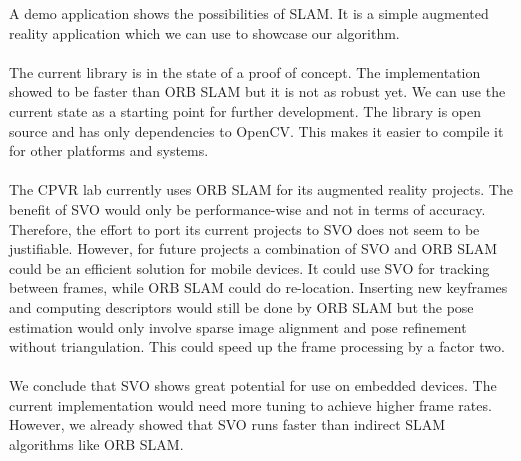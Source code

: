 \documentclass[11pt,a4paper,titlepage,oneside]{report}
\begin{document}
A demo application shows the possibilities of SLAM. It is a simple augmented reality application which we can use to showcase our algorithm.\\\\
The current library is in the state of a proof of concept. The implementation showed to be faster than ORB SLAM but it is not as robust yet. We can use the current state as a starting point for further development. The library is open source and has only dependencies to OpenCV. This makes it easier to compile it for other platforms and systems.\\\\
The CPVR lab currently uses ORB SLAM for its augmented reality projects. The benefit of SVO would only be performance-wise and not in terms of accuracy. Therefore, the effort to port its current projects to SVO does not seem to be justifiable. However, for future projects a combination of SVO and ORB SLAM could be an efficient solution for mobile devices. It could use SVO for tracking between frames, while ORB SLAM could do re-location. Inserting new keyframes and computing descriptors would still be done by ORB SLAM but the pose estimation would only involve sparse image alignment and pose refinement without triangulation. This could speed up the frame processing by a factor two.\\\\
We conclude that SVO shows great potential for use on embedded devices. The current implementation would need more tuning to achieve higher frame rates. However, we already showed that SVO runs faster than indirect SLAM algorithms like ORB SLAM.

\printbibliography
\end{document}

